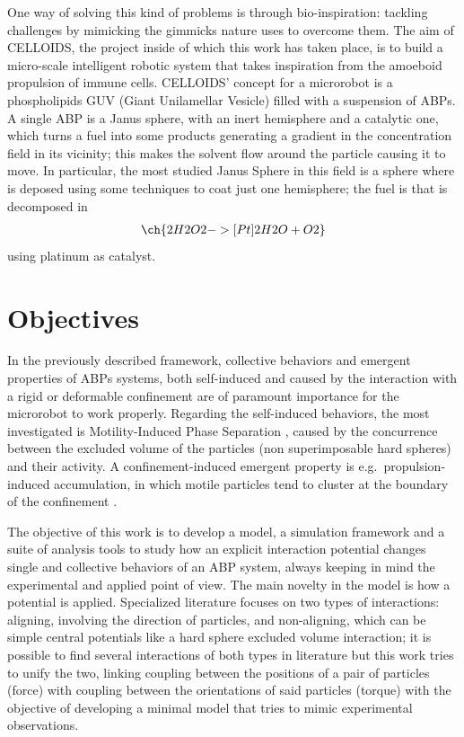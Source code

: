\documentclass[../../master_thesis_np.tex]{subfiles}
\begin{document}
	One way of solving this kind of problems is through bio-inspiration: tackling challenges by mimicking the gimmicks nature uses to overcome them. The aim of CELLOIDS, the project inside of which this work has taken place, is to build a micro-scale intelligent robotic system that takes inspiration from the amoeboid propulsion of immune cells. CELLOIDS’ concept for a microrobot is a phospholipids GUV (Giant Unilamellar Vesicle) filled with a suspension of ABPs. A single ABP is a Janus sphere, with an inert hemisphere and a catalytic one, which turns a fuel into some products generating a gradient in the concentration field in its vicinity; this makes the solvent flow around the particle causing it to move. In particular, the most studied Janus Sphere in this field is a  sphere where  is deposed using some techniques to coat just one hemisphere; the fuel is  that is decomposed in 
	\begin{align}
		\ch{2 H2O2 ->[Pt] 2 H2O + O2}
	\end{align}
	using platinum as catalyst.
	
	
	\section{Objectives}	
	In the previously described framework, collective behaviors and emergent properties of ABPs systems, both self-induced and caused by the interaction with a rigid or deformable confinement are of paramount importance for the microrobot to work properly. Regarding the self-induced behaviors, the most investigated is Motility-Induced Phase Separation \parencite{cates_motility-induced_2015}, caused by the concurrence between the excluded volume of the particles (non superimposable hard spheres) and their activity. A confinement-induced emergent property is e.g.~propulsion-induced accumulation, in which motile particles tend to cluster at the boundary of the confinement \parencite{marconi_towards_2015}.
	
	The objective of this work is to develop a model, a simulation framework and a suite of analysis tools to study how an explicit interaction potential changes single and collective behaviors of an ABP system, always keeping in mind the experimental and applied point of view. The main novelty in the model is how a potential is applied. Specialized literature focuses on two types of interactions: aligning, involving the direction of particles, and non-aligning, which can be simple central potentials like a hard sphere excluded volume interaction; it is possible to find several interactions of both types in literature but this work tries to unify the two, linking coupling between the positions of a pair of particles (force) with coupling between the orientations of said particles (torque) with the objective of developing a minimal model that tries to mimic experimental observations.
	
\end{document}
